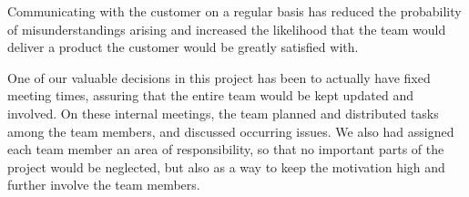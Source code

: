 Communicating with the customer on a regular basis has reduced the probability of misunderstandings arising and increased the likelihood that the team would deliver a product the customer would be greatly satisfied with. 

One of our valuable decisions in this project has been to actually have fixed meeting times, assuring that the entire team would be kept updated and involved. On these internal meetings, the team planned and distributed tasks among the team members, and discussed occurring issues. We also had assigned each team member an area of responsibility, so that no important parts of the project would be neglected, but also as a way to keep the motivation high and further involve the team members.